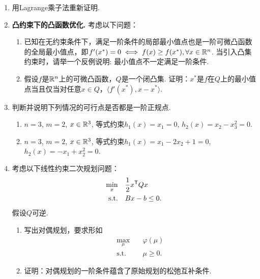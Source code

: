 \begin{enumerate}[wide, labelindent=0pt]
    \item 用Lagrange乘子法重新证明.
    \item \textbf{凸约束下的凸函数优化.} 考虑以下问题：
    \begin{enumerate}
        \item 已知在无约束条件下，满足一阶条件的局部最小值点也是一阶可微凸函数的全局最小值点，即$f'(x^*)=0\iff f(x)\ge f(x^*), \forall x\in \mathbb{R}^n$. 当引入凸集约束时，请举一个反例说明: 最小值点不一定满足一阶条件.
        \item 假设$f$是$\mathbb{R}^n$上的可微凸函数，$Q$是一个闭凸集. 证明：$x^*$是$f$在$Q$上的最小值点当且仅当对任意$x\in Q$，$\langle f'(x^*),x-x^*\rangle$.
    \end{enumerate}

    \item 判断并说明下列情况的可行点是否都是一阶正规点.
    \begin{enumerate}
    \item $n=3$, $m=2$, $x\in\mathbb{R}^3$, 等式约束$h_1(x) = x_1=0$, $h_2(x)=x_2-x_3^2=0$.
    \item $n=3$, $m=2$, $x\in \mathbb{R}^3$, 等式约束$h_1(x)=x_1-2x_2+1=0$, $h_2(x)=-x_1+x_2^2=0$.
    \end{enumerate}

    \item 考虑以下线性约束二次规划问题：
    \begin{align*}
    \min_x \quad&  \frac{1}{2}x^{\mathsf{T}} Qx\\
    \text{s.t.}\quad& Bx-b\le 0. 
    \end{align*}
    假设$Q$可逆.
    \begin{enumerate}
        \item 写出对偶规划，要求形如
        \begin{align*}
        \max_\mu \quad&  \varphi(\mu)\\
        \text{s.t.}\quad& \mu\geq 0. 
        \end{align*}
        \item 证明：对偶规划的一阶条件蕴含了原始规划的松弛互补条件.
    \end{enumerate}


\end{enumerate}
